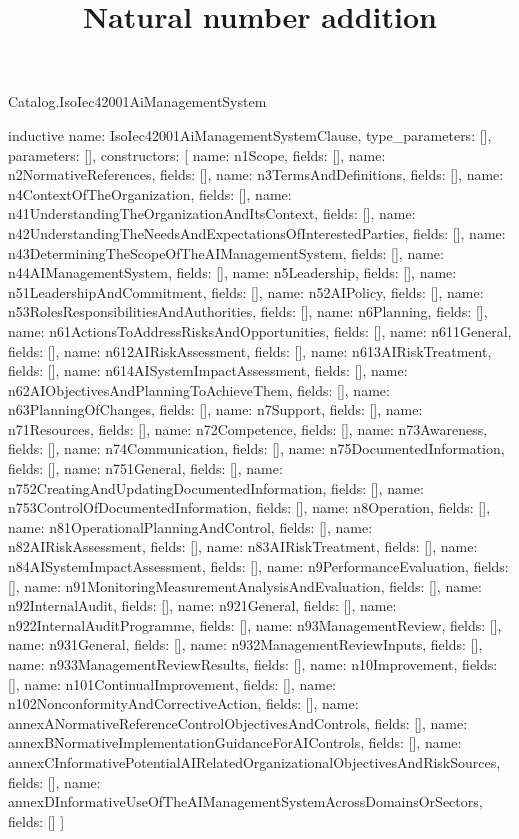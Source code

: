 \begin{lexlean}{Catalog.IsoIec42001AiManagementSystem}
\title{Natural number addition}
\begin{semanticmodule}
inductive{
  name: IsoIec42001AiManagementSystemClause,
  type_parameters: [],
  parameters: [],
  constructors: [
    {name: n1Scope, fields: []},
    {name: n2NormativeReferences, fields: []},
    {name: n3TermsAndDefinitions, fields: []},
    {name: n4ContextOfTheOrganization, fields: []},
    {name: n41UnderstandingTheOrganizationAndItsContext, fields: []},
    {name: n42UnderstandingTheNeedsAndExpectationsOfInterestedParties, fields: []},
    {name: n43DeterminingTheScopeOfTheAIManagementSystem, fields: []},
    {name: n44AIManagementSystem, fields: []},
    {name: n5Leadership, fields: []},
    {name: n51LeadershipAndCommitment, fields: []},
    {name: n52AIPolicy, fields: []},
    {name: n53RolesResponsibilitiesAndAuthorities, fields: []},
    {name: n6Planning, fields: []},
    {name: n61ActionsToAddressRisksAndOpportunities, fields: []},
    {name: n611General, fields: []},
    {name: n612AIRiskAssessment, fields: []},
    {name: n613AIRiskTreatment, fields: []},
    {name: n614AISystemImpactAssessment, fields: []},
    {name: n62AIObjectivesAndPlanningToAchieveThem, fields: []},
    {name: n63PlanningOfChanges, fields: []},
    {name: n7Support, fields: []},
    {name: n71Resources, fields: []},
    {name: n72Competence, fields: []},
    {name: n73Awareness, fields: []},
    {name: n74Communication, fields: []},
    {name: n75DocumentedInformation, fields: []},
    {name: n751General, fields: []},
    {name: n752CreatingAndUpdatingDocumentedInformation, fields: []},
    {name: n753ControlOfDocumentedInformation, fields: []},
    {name: n8Operation, fields: []},
    {name: n81OperationalPlanningAndControl, fields: []},
    {name: n82AIRiskAssessment, fields: []},
    {name: n83AIRiskTreatment, fields: []},
    {name: n84AISystemImpactAssessment, fields: []},
    {name: n9PerformanceEvaluation, fields: []},
    {name: n91MonitoringMeasurementAnalysisAndEvaluation, fields: []},
    {name: n92InternalAudit, fields: []},
    {name: n921General, fields: []},
    {name: n922InternalAuditProgramme, fields: []},
    {name: n93ManagementReview, fields: []},
    {name: n931General, fields: []},
    {name: n932ManagementReviewInputs, fields: []},
    {name: n933ManagementReviewResults, fields: []},
    {name: n10Improvement, fields: []},
    {name: n101ContinualImprovement, fields: []},
    {name: n102NonconformityAndCorrectiveAction, fields: []},
    {name: annexANormativeReferenceControlObjectivesAndControls, fields: []},
    {name: annexBNormativeImplementationGuidanceForAIControls, fields: []},
    {name: annexCInformativePotentialAIRelatedOrganizationalObjectivesAndRiskSources, fields: []},
    {name: annexDInformativeUseOfTheAIManagementSystemAcrossDomainsOrSectors, fields: []}
  ]
}


\end{semanticmodule}
\end{lexlean}
